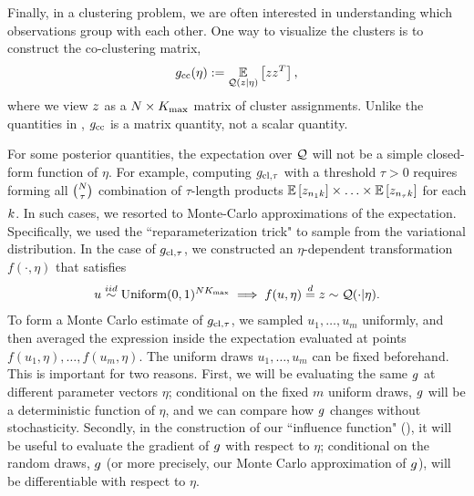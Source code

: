 \begin{ex}[Co-clustering]

Finally, in a clustering problem, we are often interested in understanding
which observations group with each other.
One way to visualize the clusters is to construct the co-clustering matrix,
\begin{align*}
g_{\text{cc}}(\eta) := \underset{\mathcal{Q}(z\vert\eta)}{\mathbb{E}}\left[zz^{T}\right],
\end{align*}
where we view $z$ as a $N\times {K_{\mathrm{max}}}$ matrix of cluster assignments.
Unlike the quantities in ,
$g_{\text{cc}}$ is a matrix quantity, not a scalar quantity.

\end{ex}

For some posterior quantities, the expectation over $\mathcal{Q}$ will not be a simple
closed-form function of $\eta$. For example, computing $g_{\text{cl},\tau}$ with a
threshold $\tau > 0$ requires forming all ${N\choose\tau}$ combination of
$\tau$-length products $\underset{}{\mathbb{E}}\left[z_{n_1k}\right]\times \ldots \times
\underset{}{\mathbb{E}}\left[z_{n_\tau k}\right]$ for each $k$. In such cases, we resorted to
Monte-Carlo approximations of the expectation. Specifically, we used the
``reparameterization trick" to sample from the variational distribution. In the
case of $g_{\text{cl},\tau}$, we constructed an $\eta$-dependent transformation
$f(\cdot, \eta)$ that satisfies \begin{align*} u \overset{iid}{\sim}\text{Uniform}(0,
1)^{N{K_{\mathrm{max}}}} \implies f(u, \eta) \stackrel{d}{=} z \sim \mathcal{Q}(\cdot | \eta).
\end{align*} To form a Monte Carlo estimate of $g_{\text{cl},\tau}$, we sampled $u_1,
\dots, u_m$ uniformly, and then averaged the expression inside the expectation
evaluated at points $f(u_1, \eta), \ldots, f(u_m, \eta)$. The uniform draws
$u_1, \dots, u_m$ can be fixed beforehand. This is important for two reasons.
First, we will be evaluating the same $g$ at different parameter vectors
$\eta$; conditional on the fixed $m$ uniform draws, $g$ will be a deterministic
function of $\eta$, and we can compare how $g$ changes without stochasticity.
Secondly, in the construction of our ``influence function"
(), it will be useful to evaluate the gradient
of $g$ with respect to $\eta$; conditional on the random draws, $g$ (or more
precisely, our Monte Carlo approximation of $g$), will be differentiable with
respect to $\eta$.


\hrulefill



